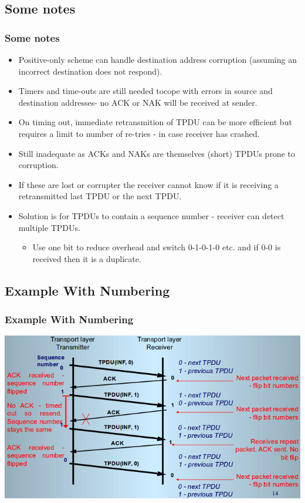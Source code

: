 \documentclass{beamer}
\begin{document}
\subsection{Some notes}
\begin{frame}
\frametitle{Some notes}
\begin{itemize}
\item Positive-only scheme can handle destination address corruption (assuming an incorrect destination does not respond).
\item Timers and time-outs are still needed tocope with errors in source and destination addresses- no ACK or NAK will be received at sender.
\item On timing out, immediate retransmition of TPDU can be more efficient but requires a limit to number of re-tries - in case receiver has crashed.
\item Still inadequate as ACKs and NAKs are themselves (short) TPDUs prone to corruption.
\item If these are lost or corrupter the receiver cannot know if it is receiving a retransmitted last TPDU or the next TPDU.
\item Solution is for TPDUs to contain a sequence number - receiver can detect multiple TPDUs.
\begin{itemize}
\item Use one bit to reduce overhead and switch 0-1-0-1-0 etc. and if 0-0 is received then it is a duplicate.
\end{itemize}
\end{itemize}
\end{frame}
\subsection{Example With Numbering}
\begin{frame}
\frametitle{Example With Numbering}
\includegraphics[scale=0.5]{swn.png}
\end{frame}
\end{document}
